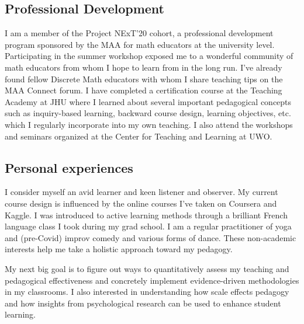 \subsection*{Professional Development}
  I am a member of the Project NExT'20 cohort, a professional development program sponsored by the MAA for math educators at the university level.
  Participating in the summer workshop exposed me to a wonderful community of math educators from whom I hope to learn from in the long run.
  I've already found fellow Discrete Math educators with whom I share teaching tips on the MAA Connect forum.
  I have completed a certification course at the Teaching Academy at JHU where I learned about several important pedagogical concepts such as inquiry-based learning, backward course design, learning objectives, etc. which I regularly incorporate into my own teaching.
  I also attend the workshops and seminars organized at the Center for Teaching and Learning at UWO. 

\subsection*{Personal experiences}
  I consider myself an avid learner and keen listener and observer. 
  My current course design is influenced by the online courses I've taken on Coursera and Kaggle.
  I was introduced to active learning methods through a brilliant French language class I took during my grad school.
  I am a regular practitioner of yoga and (pre-Covid) improv comedy and various forms of dance. 
  These non-academic interests help me take a holistic approach toward my pedagogy.

  My next big goal is to figure out ways to quantitatively assess my teaching and pedagogical effectiveness and concretely implement evidence-driven methodologies in my classrooms.
  I also interested in understanding how scale effects pedagogy and how insights from psychological research can be used to enhance student learning.